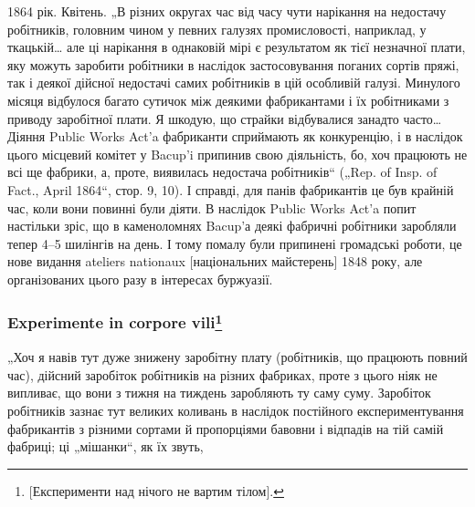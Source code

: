 1864 рік. Квітень. „В різних округах час від часу чути нарікання
на недостачу робітників, головним чином у певних галузях
промисловості, наприклад, у ткацькій\dots{} але ці нарікання в однаковій
мірі є результатом як тієї незначної плати, яку можуть заробити
робітники в наслідок застосовування поганих сортів пряжі,
так і деякої дійсної недостачі самих робітників в цій особливій
галузі. Минулого місяця відбулося багато сутичок між деякими
фабрикантами і їх робітниками з приводу заробітної плати.
Я шкодую, що страйки відбувалися занадто часто\dots{} Діяння
Public Works Act’a фабриканти сприймають як конкуренцію,
і в наслідок цього місцевий комітет у Bacup’i припинив свою
діяльність, бо, хоч працюють не всі ще фабрики, а, проте, виявилась
недостача робітників“ („Rep. of Insp. of Fact., April 1864“,
стор. 9, 10). І справді, для панів фабрикантів це був крайній
час, коли вони повинні були діяти. В наслідок Public Works
Act’a попит настільки зріс, що в каменоломнях Bacup’а деякі
фабричні робітники заробляли тепер 4--5 шилінгів на день.
І тому помалу були припинені громадські роботи, це нове видання
ateliers nationaux [національних майстерень] 1848 року,
але організованих цього разу в інтересах буржуазії.

\subsubsection{Experimente in corpore vili\footnote*{
[Експерименти над нічого не вартим тілом].
}}

„Хоч я навів тут дуже знижену заробітну плату (робітників,
що працюють повний час), дійсний заробіток робітників на
різних фабриках, проте з цього ніяк не випливає, що вони
з тижня на тиждень заробляють ту саму суму. Заробіток робітників
зазнає тут великих коливань в наслідок постійного експериментування
фабрикантів з різними сортами й пропорціями бавовни
і відпадів на тій самій фабриці; ці „мішанки“, як їх звуть,
\parbreak{}  %
